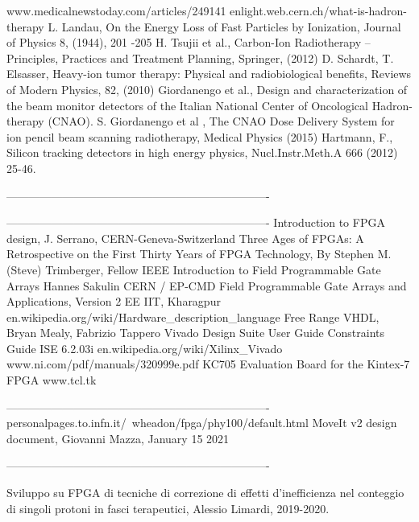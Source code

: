\begin{thebibliography}{00}	
	www.medicalnewstoday.com/articles/249141
	enlight.web.cern.ch/what-is-hadron-therapy
	L. Landau, On the Energy Loss of Fast Particles by Ionization, Journal of
	Physics 8, (1944), 201 -205
	H. Tsujii et al., Carbon-Ion Radiotherapy – Principles, Practices and Treatment
	Planning, Springer, (2012)
	D. Schardt, T. Elsasser, Heavy-ion tumor therapy: Physical and radiobiological
	benefits, Reviews of Modern Physics, 82, (2010)
	Giordanengo et al., Design and characterization of the beam monitor detectors
	of the Italian National Center of Oncological Hadron-therapy (CNAO).
	S. Giordanengo et al , The CNAO Dose Delivery System for ion pencil beam
	scanning radiotherapy, Medical Physics (2015)
	Hartmann, F., Silicon tracking detectors in high energy physics, Nucl.Instr.Meth.A
	666 (2012) 25-46.
	
	----------------------------------------------------------------------
	
	----------------------------------------------------------------------
	Introduction to FPGA design, J. Serrano, CERN-Geneva-Switzerland
	Three Ages of FPGAs: A Retrospective on the First Thirty Years of FPGA Technology, By Stephen M. (Steve) Trimberger, Fellow IEEE
	Introduction to Field Programmable Gate Arrays Hannes Sakulin CERN / EP-CMD
	Field Programmable Gate Arrays and Applications, Version 2 EE IIT, Kharagpur
	en.wikipedia.org/wiki/Hardware\_description\_language
	Free Range VHDL, Bryan Mealy, Fabrizio Tappero
	Vivado Design Suite User Guide
	Constraints Guide ISE 6.2.03i
	en.wikipedia.org/wiki/Xilinx\_Vivado
	www.ni.com/pdf/manuals/320999e.pdf
	KC705 Evaluation Board for the Kintex-7 FPGA	
	www.tcl.tk
	
	
	----------------------------------------------------------------------
	personalpages.to.infn.it/~wheadon/fpga/phy100/default.html
	MoveIt v2 design document, Giovanni Mazza, January 15 2021
	
	----------------------------------------------------------------------
	
	Sviluppo su FPGA di tecniche di correzione di effetti d'inefficienza nel conteggio di singoli protoni in fasci terapeutici, Alessio Limardi, 2019-2020.
	
\end{thebibliography}
